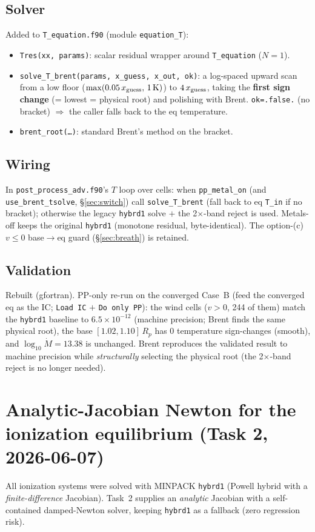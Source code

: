 \documentclass[english,a4paper]{my_memo}
\begin{document}
\subsection{Solver}
Added to \texttt{T\_equation.f90} (module \texttt{equation\_T}):
\begin{itemize}
\item \texttt{Tres(xx, params)}: scalar residual wrapper around
  \texttt{T\_equation} ($N=1$).
\item \texttt{solve\_T\_brent(params, x\_guess, x\_out, ok)}: a log-spaced
  upward scan from a low floor ($\max(0.05\,x_{\rm guess},\,1\,{\rm K})$) to
  $4\,x_{\rm guess}$, taking the \textbf{first sign change} (= lowest = physical
  root) and polishing with Brent. \texttt{ok=.false.} (no bracket) $\Rightarrow$
  the caller falls back to the eq temperature.
\item \texttt{brent\_root(\ldots)}: standard Brent's method on the bracket.
\end{itemize}

\subsection{Wiring}
In \texttt{post\_process\_adv.f90}'s $T$ loop over cells: when \texttt{pp\_metal\_on}
(and \texttt{use\_brent\_tsolve}, \S\ref{sec:switch}) call \texttt{solve\_T\_brent}
(fall back to eq \texttt{T\_in} if no bracket); otherwise the legacy \texttt{hybrd1}
solve $+$ the 2$\times$-band reject is used. Metals-off keeps the original
\texttt{hybrd1} (monotone residual, byte-identical). The option-(c) $v\le0$
base$\to$eq guard (\S\ref{sec:breath}) is retained.

\subsection{Validation}
Rebuilt (gfortran). PP-only re-run on the converged Case~B (feed the converged eq
as the IC; \texttt{Load IC} $+$ \texttt{Do only PP}): the wind cells ($v>0$, 244 of
them) match the \texttt{hybrd1} baseline to \textbf{$6.5\times10^{-12}$} (machine
precision; Brent finds the same physical root), the base $[1.02,1.10]\,R_p$ has 0
temperature sign-changes (smooth), and $\log_{10}\dot M=13.38$ is unchanged. Brent
reproduces the validated result to machine precision while \emph{structurally}
selecting the physical root (the 2$\times$-band reject is no longer needed).

\section{Analytic-Jacobian Newton for the ionization equilibrium (Task 2, 2026-06-07)}\label{sec:task2}
All ionization systems were solved with MINPACK \texttt{hybrd1} (Powell hybrid with
a \emph{finite-difference} Jacobian). Task~2 supplies an \emph{analytic} Jacobian
with a self-contained damped-Newton solver, keeping \texttt{hybrd1} as a fallback
(zero regression risk).
\end{document}
